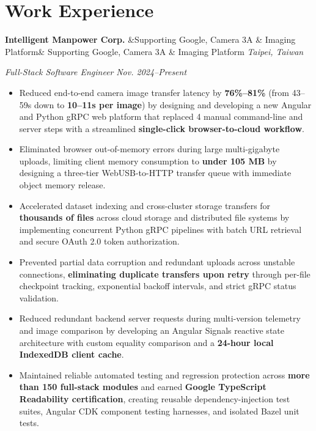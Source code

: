 \documentclass[10pt,a4paper]{article}
\newcommand{\entryheader}[3]{%
  \noindent%
  \textbf{\color{maindark}#1}%
  \ifx&#2&%
  \else%
    { \small\color{subgray}#2}%
  \fi%
  \hfill%
  \textit{\color{locationcoral}#3}\par%
}
\newcommand{\entrysubheader}[2]{%
  \noindent%
  \textit{\color{subgray}#1}%
  \hfill%
  \textit{\color{subgray}#2}\par%
  \vspace{1.5pt}%
}
\begin{document}
\section{Work Experience}

\entryheader{Intelligent Manpower Corp.}{Supporting Google, Camera 3A \& Imaging Platform}{Taipei, Taiwan}
\entrysubheader{Full-Stack Software Engineer}{Nov. 2024--Present}
\begin{itemize}
    \item {Reduced end-to-end camera image transfer latency by \textbf{76\%--81\%} (from 43--59s down to \textbf{10--11s per image}) by designing and developing a new Angular and Python gRPC web platform that replaced 4 manual command-line and server steps with a streamlined \textbf{single-click browser-to-cloud workflow}.}
    \item {Eliminated browser out-of-memory errors during large multi-gigabyte uploads, limiting client memory consumption to \textbf{under 105 MB} by designing a three-tier WebUSB-to-HTTP transfer queue with immediate object memory release.}
    \item {Accelerated dataset indexing and cross-cluster storage transfers for \textbf{thousands of files} across cloud storage and distributed file systems by implementing concurrent Python gRPC pipelines with batch URL retrieval and secure OAuth 2.0 token authorization.}
    \item {Prevented partial data corruption and redundant uploads across unstable connections, \textbf{eliminating duplicate transfers upon retry} through per-file checkpoint tracking, exponential backoff intervals, and strict gRPC status validation.}
    \item {Reduced redundant backend server requests during multi-version telemetry and image comparison by developing an Angular Signals reactive state architecture with custom equality comparison and a \textbf{24-hour local IndexedDB client cache}.}
    \item {Maintained reliable automated testing and regression protection across \textbf{more than 150 full-stack modules} and earned \textbf{Google TypeScript Readability certification}, creating reusable dependency-injection test suites, Angular CDK component testing harnesses, and isolated Bazel unit tests.}
\end{itemize}
\end{document}
